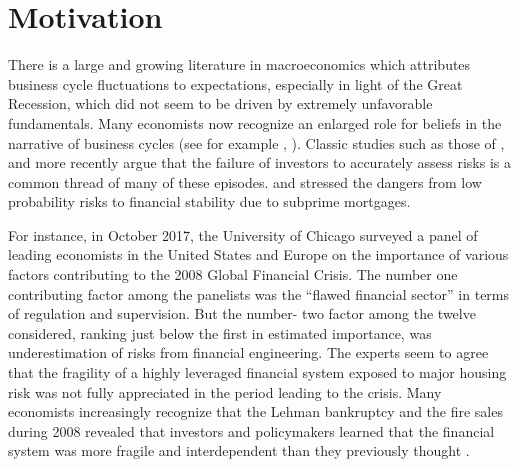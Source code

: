 \documentclass[12pt]{article}
\newcommand{\1}{\mathbbm 1}
\begin{document}
		
		
		\tableofcontents
		
		\newpage{}
		
		\vspace{-8ex}
		
		
		
		
		\section{Motivation}
	
		
	
		
		There is a large and growing literature in macroeconomics which attributes business cycle fluctuations to expectations, especially in light of the Great Recession, which did not seem to be driven by extremely unfavorable fundamentals. Many economists now recognize an enlarged role for beliefs in the narrative of business cycles (see for example \cite{veldkamp2019tail}, \cite{gennaioli2020crisis}). Classic studies such as those of \cite{minsky1977financial}, \cite{kindleberger1978manias} and more recently \cite{reinhart2009time} argue that the failure of investors to accurately assess risks is a common thread of many of these episodes. \cite{rajan2006has} and \cite{taleb2007black} stressed the dangers from low probability risks to financial stability due to subprime mortgages.
		
		 For instance, in October 2017, the University of Chicago surveyed
		 a panel of leading economists in the United States and Europe on the importance
		 of various factors contributing to the 2008 Global Financial
		 Crisis. The number one contributing factor among the panelists was the
		 ``flawed financial sector'' in terms of regulation and supervision. But the
		 number- two factor among the twelve considered, ranking just below
		 the first in estimated importance, was underestimation of risks from
		 financial engineering. The experts seem to agree that the fragility of a
		 highly leveraged financial system exposed to major housing risk was
		 not fully appreciated in the period leading to the crisis. Many economists increasingly recognize that the Lehman bankruptcy and the fire sales during 2008 revealed that investors and policymakers learned that the financial system was more fragile and interdependent than they previously thought \cite{gennaioli2020crisis}.
		 
\end{document}
